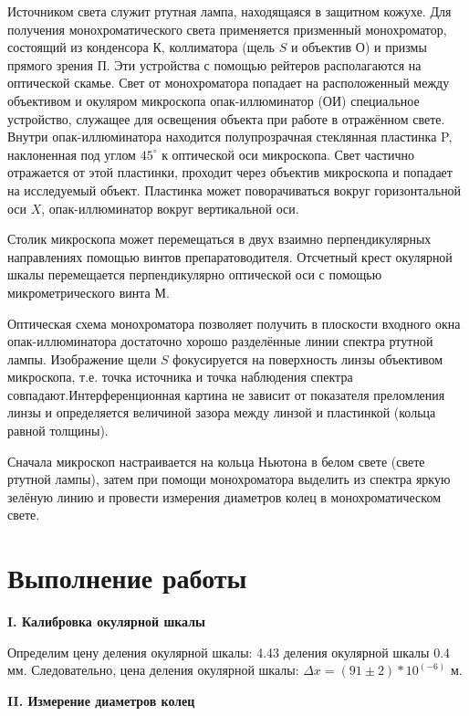 \documentclass[a4paper,12pt]{report}
\begin{document}
	Источником света служит ртутная лампа, находящаяся в защитном кожухе. Для получения монохроматического света применяется призменный монохроматор, состоящий из конденсора $ К $, коллиматора (щель $ S $ и объектив $ О $) и призмы прямого зрения $ П $. Эти устройства с помощью рейтеров располагаются на оптической скамье. Свет от монохроматора попадает на расположенный между объективом и окуляром микроскопа опак-иллюминатор (ОИ)  специальное устройство, служащее для освещения объекта при работе в отражённом свете. Внутри опак-иллюминатора находится полупрозрачная стеклянная пластинка P, наклоненная под углом $ 45^\circ $ к оптической оси микроскопа. Свет частично отражается от этой пластинки, проходит через объектив микроскопа и попадает на исследуемый объект. Пластинка может поворачиваться вокруг горизонтальной оси $ X $, опак-иллюминатор вокруг вертикальной оси.

	Столик микроскопа может перемещаться в двух взаимно перпендикулярных направлениях помощью винтов препаратоводителя. Отсчетный крест окулярной шкалы перемещается перпендикулярно оптической оси с помощью микрометрического винта $ М $.
	
	Оптическая схема монохроматора позволяет получить в плоскости входного окна опак-иллюминатора достаточно хорошо разделённые линии спектра ртутной лампы. Изображение щели $ S $ фокусируется на поверхность линзы объективом микроскопа, т.е. точка источника и точка наблюдения спектра совпадают.Интерференционная картина не зависит от показателя преломления линзы и определяется величиной зазора между линзой и пластинкой (кольца равной толщины).

	Сначала микроскоп настраивается на кольца Ньютона в белом свете (свете ртутной лампы), затем при помощи монохроматора выделить из спектра яркую зелёную линию и провести измерения диаметров колец в монохроматическом свете. 
	

\newpage
\section*{\huge{Выполнение работы}}

\vspace{\baselineskip}
\noindent\textbf{I. Калибровка окулярной шкалы}

Определим цену деления окулярной шкалы: 4.43 деления окулярной шкалы 0.4 мм. Следовательно, цена деления окулярной шкалы: $\Delta x = (91 \pm 2)*10^(-6)$ м.

\noindent\textbf{II. Измерение диаметров колец}
\end{document}

